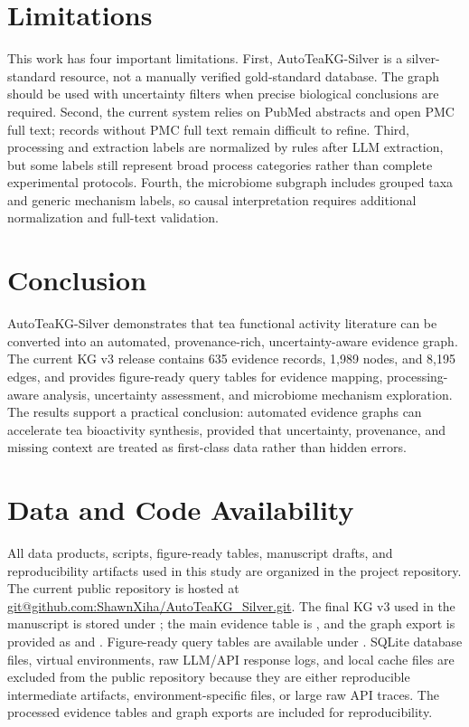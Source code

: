 \documentclass[11pt]{article}
\begin{document}
\section{Limitations}

This work has four important limitations. First, AutoTeaKG-Silver is a silver-standard resource, not a manually verified gold-standard database. The graph should be used with uncertainty filters when precise biological conclusions are required. Second, the current system relies on PubMed abstracts and open PMC full text; records without PMC full text remain difficult to refine. Third, processing and extraction labels are normalized by rules after LLM extraction, but some labels still represent broad process categories rather than complete experimental protocols. Fourth, the microbiome subgraph includes grouped taxa and generic mechanism labels, so causal interpretation requires additional normalization and full-text validation.

\section{Conclusion}

AutoTeaKG-Silver demonstrates that tea functional activity literature can be converted into an automated, provenance-rich, uncertainty-aware evidence graph. The current KG v3 release contains 635 evidence records, 1,989 nodes, and 8,195 edges, and provides figure-ready query tables for evidence mapping, processing-aware analysis, uncertainty assessment, and microbiome mechanism exploration. The results support a practical conclusion: automated evidence graphs can accelerate tea bioactivity synthesis, provided that uncertainty, provenance, and missing context are treated as first-class data rather than hidden errors.

\section*{Data and Code Availability}

All data products, scripts, figure-ready tables, manuscript drafts, and reproducibility artifacts used in this study are organized in the project repository. The current public repository is hosted at \url{git@github.com:ShawnXiha/AutoTeaKG_Silver.git}. The final KG v3 used in the manuscript is stored under ; the main evidence table is , and the graph export is provided as  and . Figure-ready query tables are available under . SQLite database files, virtual environments, raw LLM/API response logs, and local cache files are excluded from the public repository because they are either reproducible intermediate artifacts, environment-specific files, or large raw API traces. The processed evidence tables and graph exports are included for reproducibility.
\end{document}
